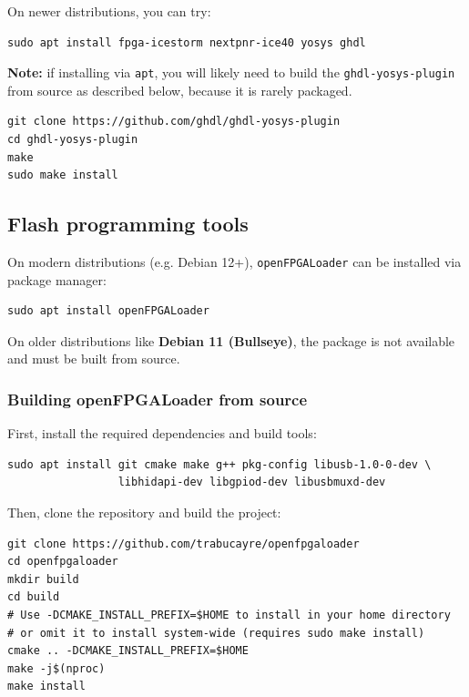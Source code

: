 \documentclass[11pt,a4paper]{article}
\newcommand{\cmd}[1]{\texttt{#1}}
\begin{document}
On newer distributions, you can try:

\begin{lstlisting}[style=shell]
sudo apt install fpga-icestorm nextpnr-ice40 yosys ghdl
\end{lstlisting}

\textbf{Note:} if installing via \cmd{apt}, you will likely need to build the \cmd{ghdl-yosys-plugin} from source as described below, because it is rarely packaged.

\begin{lstlisting}[style=shell]
git clone https://github.com/ghdl/ghdl-yosys-plugin
cd ghdl-yosys-plugin
make
sudo make install
\end{lstlisting}

\subsection{Flash programming tools}

On modern distributions (e.g. Debian 12+), \cmd{openFPGALoader} can be installed via package manager:

\begin{lstlisting}[style=shell]
sudo apt install openFPGALoader
\end{lstlisting}

On older distributions like \textbf{Debian 11 (Bullseye)}, the package is not available and must be built from source.

\subsubsection{Building openFPGALoader from source}

First, install the required dependencies and build tools:

\begin{lstlisting}[style=shell]
sudo apt install git cmake make g++ pkg-config libusb-1.0-0-dev \
                 libhidapi-dev libgpiod-dev libusbmuxd-dev
\end{lstlisting}

Then, clone the repository and build the project:

\begin{lstlisting}[style=shell]
git clone https://github.com/trabucayre/openfpgaloader
cd openfpgaloader
mkdir build
cd build
# Use -DCMAKE_INSTALL_PREFIX=$HOME to install in your home directory
# or omit it to install system-wide (requires sudo make install)
cmake .. -DCMAKE_INSTALL_PREFIX=$HOME
make -j$(nproc)
make install
\end{lstlisting}
\end{document}
